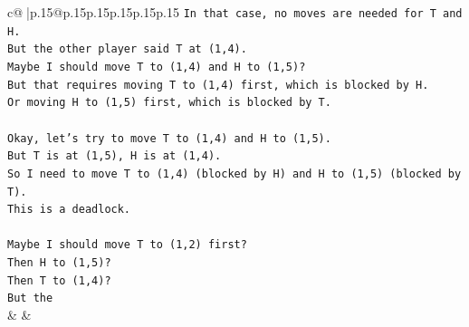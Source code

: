\documentclass{article}
\begin{document}
{\begin{supertabular}{c@{$\;$}|p{.15\linewidth}@{}p{.15\linewidth}p{.15\linewidth}p{.15\linewidth}p{.15\linewidth}p{.15\linewidth}}
{{{\texttt{In that case, no moves are needed for T and H.} \\
\texttt{But the other player said T at (1,4).} \\
\texttt{Maybe I should move T to (1,4) and H to (1,5)?} \\
\texttt{But that requires moving T to (1,4) first, which is blocked by H.} \\
\texttt{Or moving H to (1,5) first, which is blocked by T.} \\
\\ 
\texttt{Okay, let's try to move T to (1,4) and H to (1,5).} \\
\texttt{But T is at (1,5), H is at (1,4).} \\
\texttt{So I need to move T to (1,4) (blocked by H) and H to (1,5) (blocked by T).} \\
\texttt{This is a deadlock.} \\
\\ 
\texttt{Maybe I should move T to (1,2) first?} \\
\texttt{Then H to (1,5)?} \\
\texttt{Then T to (1,4)?} \\
\texttt{But the} \\
            }
        }
    }
    & & \\ \\


\end{supertabular}}
\end{document}
